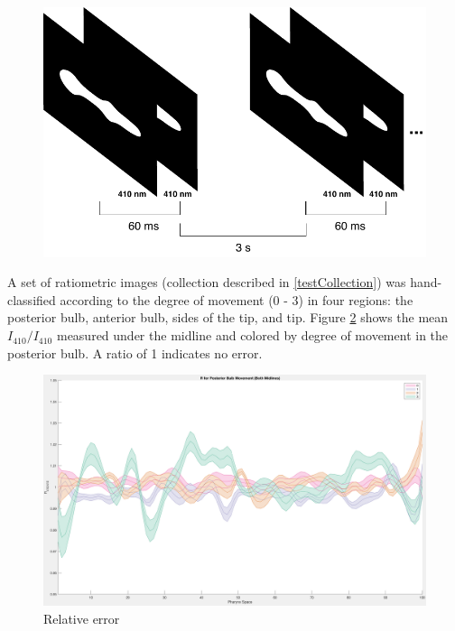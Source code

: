 \begin{figure}[ht]
    \centering
    \includegraphics[scale=0.8]{Figures/rendered_files/test_imaging_schematic}
    \decoRule
    \caption[Test imaging schematic]{}
    \label{fig:TestImagingSchematic}
\end{figure}

A set of ratiometric images (collection described in \ref{testCollection}) was hand-classified according to the degree of movement (0 - 3) in four regions: the posterior bulb, anterior bulb, sides of the tip, and tip. Figure \ref{fig:RPosteriorMovement} shows the mean $I_{410}/I_{410}$ measured under the midline and colored by degree of movement in the posterior bulb. A ratio of 1 indicates no error.

\begin{figure}[ht]
    \centering
    \includegraphics[scale=0.25]{Figures/rendered_files/R_posterior_movement}
    \decoRule
    \caption[Error by strategy in the natural data set]{Relative error}
    \label{fig:RPosteriorMovement}
\end{figure}

